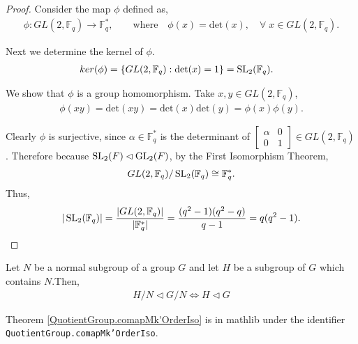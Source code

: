 \begin{proof} 
Consider the map $\phi$ defined as,
\begin{align*} \phi : GL(2,\mathbb{F}_q) \longrightarrow \mathbb{F}^*_q, \qquad \text{where} \quad \! \! \phi(x) = \text{det}(x), \quad \forall \; x \in GL(2,\mathbb{F}_q).
\end{align*}

Next we determine the kernel of $\phi$.
\begin{align*} ker(\phi) &= \{  GL(2,\mathbb{F}_q) : \text{det}(x) = 1 \} = \operatorname{SL}_2(\mathbb{F}_q).
\end{align*}

We show that $\phi$ is a group homomorphism. Take $x,y \in GL(2,\mathbb{F}_q)$,
\begin{align*} 
\phi(xy) = \text{det}(xy) = \text{det}(x) \text{det}(y) = \phi(x) \phi(y).
\end{align*}

Clearly $\phi$ is surjective, since $\alpha \in \mathbb{F}^*_q$ is the determinant of $\begin{bmatrix} \alpha & 0 \\ 0 & 1 \end{bmatrix} \in GL(2,\mathbb{F}_q)$. Therefore because $\operatorname{SL}_2(F) \lhd \operatorname{GL}_2(F)$, by the First Isomorphism Theorem,
\begin{align*} GL(2,\mathbb{F}_q) / \operatorname{SL}_2(\mathbb{F}_q) \cong \mathbb{F}^*_q.
\end{align*}
Thus,
\begin{align*} |\operatorname{SL}_2(\mathbb{F}_q)| =  \frac{|GL(2,\mathbb{F}_q)|}{|\mathbb{F}^*_q|} = \frac{(q^2-1)(q^2-q)}{q-1} = q(q^2-1).
\end{align*}

\end{proof}


\begin{lemma}
    \label{QuotientGroup.comapMk'OrderIso}
Let $N$ be a normal subgroup of a group $G$ and let $H$ be a subgroup of $G$ which contains $N$.Then,
\begin{align*} H / N \vartriangleleft G / N \iff H \vartriangleleft G
\end{align*} 
\end{lemma}

\begin{remark}
    Theorem \ref{QuotientGroup.comapMk'OrderIso} is in mathlib under the identifier \texttt{QuotientGroup.comapMk'OrderIso}.
\end{remark}

